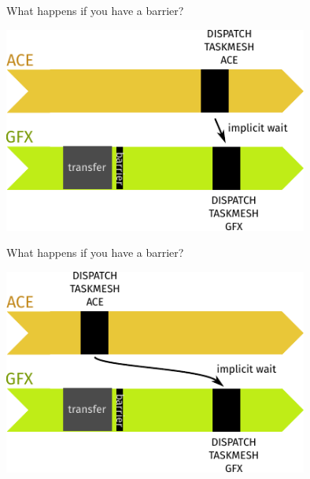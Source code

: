 \documentclass[aspectratio=169,t,xcolor=table]{beamer}
\begin{document}
\begin{frame}{What happens if you have a barrier?}

    \LARGE

    \begin{center}
        \includegraphics[height=6.75cm]{figs/task_sync_2.svg.pdf}
    \end{center}

\end{frame}

\begin{frame}{What happens if you have a barrier?}

    \LARGE

    \begin{center}
        \includegraphics[height=6.75cm]{figs/task_sync_3.svg.pdf}
    \end{center}

\end{frame}
\end{document}
